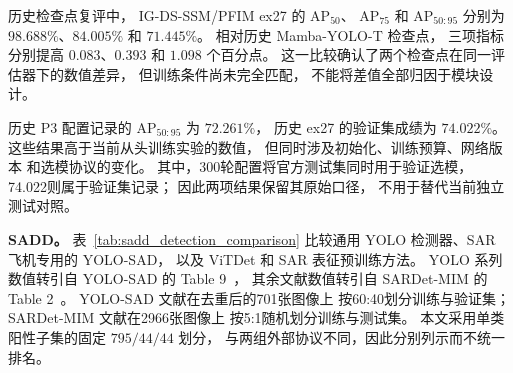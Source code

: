 历史检查点复评中，
IG-DS-SSM/PFIM ex27 的 AP$_{50}$、
AP$_{75}$ 和 AP$_{50:95}$
分别为 $98.688\%$、$84.005\%$ 和 $71.445\%$。
相对历史 Mamba-YOLO-T 检查点，
三项指标分别提高 $0.083$、$0.393$
和 $1.098$ 个百分点。
这一比较确认了两个检查点在同一评估器下的数值差异，
但训练条件尚未完全匹配，
不能将差值全部归因于模块设计。

历史 P3 配置记录的 AP$_{50:95}$ 为 $72.261\%$，
历史 ex27 的验证集成绩为 $74.022\%$。
这些结果高于当前从头训练实验的数值，
但同时涉及初始化、训练预算、网络版本
和选模协议的变化。
其中，300轮配置将官方测试集同时用于验证选模，
74.022则属于验证集记录；
因此两项结果保留其原始口径，
不用于替代当前独立测试对照。

\textbf{SADD。}
表~\ref{tab:sadd_detection_comparison}
比较通用 YOLO 检测器、SAR 飞机专用的 YOLO-SAD，
以及 ViTDet 和 SAR 表征预训练方法。
YOLO 系列数值转引自 YOLO-SAD 的 Table 9~\cite{yolosad2024}，
其余文献数值转引自 SARDet-MIM 的 Table 2~\cite{sardetmim2026}。
YOLO-SAD 文献在去重后的701张图像上
按60:40划分训练与验证集；
SARDet-MIM 文献在2966张图像上
按5:1随机划分训练与测试集。
本文采用单类阳性子集的固定 $795/44/44$ 划分，
与两组外部协议不同，因此分别列示而不统一排名。


